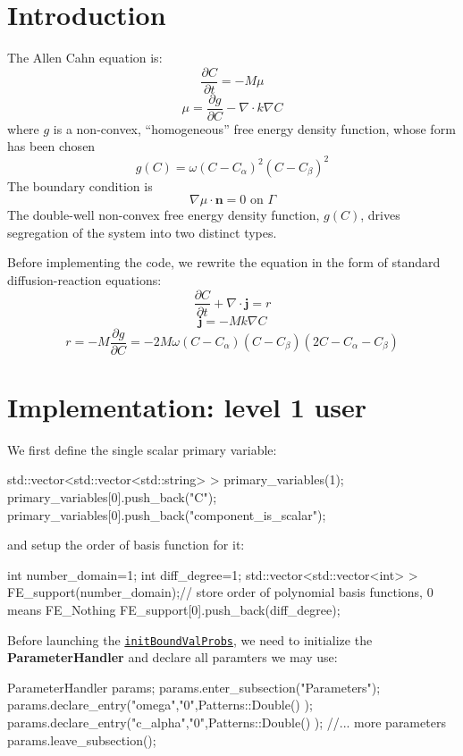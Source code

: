 \hypertarget{growth_Introduction}{}\section{Introduction}\label{growth_Introduction}
The Allen Cahn equation is\-: \[ \frac{\partial C}{\partial t}=-M\mu \] \[ \mu=\frac{\partial g}{\partial C}-\nabla\cdot k\nabla C \] where $g$ is a non-\/convex, ``homogeneous'' free energy density function, whose form has been chosen \[ g(C)=\omega(C-C_\alpha)^2(C-C_\beta)^2 \] The boundary condition is \[ \nabla \mu\cdot\boldsymbol{n}=0 \text{ on }\Gamma \] The double-\/well non-\/convex free energy density function, $g(C)$, drives segregation of the system into two distinct types.

Before implementing the code, we rewrite the equation in the form of standard diffusion-\/reaction equations\-: \[ \frac{\partial C}{\partial t}+\nabla\cdot\boldsymbol{j}=r \] \[ \boldsymbol{j}=-Mk\nabla C \] \[ r=-M\frac{\partial g}{\partial C}=-2M\omega(C-C_\alpha)(C-C_\beta)(2C-C_\alpha-C_\beta) \]\hypertarget{growth_imple}{}\section{Implementation\-: level 1 user}\label{growth_imple}
We first define the single scalar primary variable\-: 
\begin{DoxyCode}
  std::vector<std::vector<std::string> > primary\_variables(1);        
primary\_variables[0].push\_back(\textcolor{stringliteral}{"C"}); primary\_variables[0].push\_back(\textcolor{stringliteral}{"component\_is\_scalar"});
\end{DoxyCode}
 and setup the order of basis function for it\-: 
\begin{DoxyCode}
\textcolor{keywordtype}{int} number\_domain=1;
\textcolor{keywordtype}{int} diff\_degree=1;
std::vector<std::vector<int> > FE\_support(number\_domain);\textcolor{comment}{// store order of polynomial basis functions, 0
       means FE\_Nothing   }
FE\_support[0].push\_back(diff\_degree);
\end{DoxyCode}
 Before launching the \href{../html/classinit_bound_val_probs.html}{\tt init\-Bound\-Val\-Probs}, we need to initialize the {\bfseries Parameter\-Handler} and declare all paramters we may use\-: 
\begin{DoxyCode}
ParameterHandler params;
params.enter\_subsection(\textcolor{stringliteral}{"Parameters"});  
params.declare\_entry(\textcolor{stringliteral}{"omega"},\textcolor{stringliteral}{"0"},Patterns::Double() );
params.declare\_entry(\textcolor{stringliteral}{"c\_alpha"},\textcolor{stringliteral}{"0"},Patterns::Double() );
\textcolor{comment}{//... more parameters }
params.leave\_subsection();  
\end{DoxyCode}
